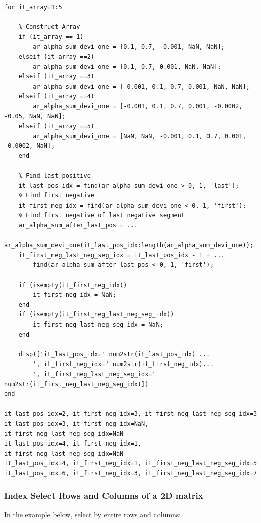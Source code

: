 \documentclass[
]{book}
\begin{document}
\begin{verbatim}
for it_array=1:5
    
    % Construct Array
    if (it_array == 1) 
        ar_alpha_sum_devi_one = [0.1, 0.7, -0.001, NaN, NaN];
    elseif (it_array ==2)
        ar_alpha_sum_devi_one = [0.1, 0.7, 0.001, NaN, NaN];
    elseif (it_array ==3)
        ar_alpha_sum_devi_one = [-0.001, 0.1, 0.7, 0.001, NaN, NaN];
    elseif (it_array ==4)
        ar_alpha_sum_devi_one = [-0.001, 0.1, 0.7, 0.001, -0.0002, -0.05, NaN, NaN];
    elseif (it_array ==5)
        ar_alpha_sum_devi_one = [NaN, NaN, -0.001, 0.1, 0.7, 0.001, -0.0002, NaN];
    end
    
    % Find last positive
    it_last_pos_idx = find(ar_alpha_sum_devi_one > 0, 1, 'last');
    % Find first negative
    it_first_neg_idx = find(ar_alpha_sum_devi_one < 0, 1, 'first');
    % Find first negative of last negative segment
    ar_alpha_sum_after_last_pos = ...
        ar_alpha_sum_devi_one(it_last_pos_idx:length(ar_alpha_sum_devi_one));
    it_first_neg_last_neg_seg_idx = it_last_pos_idx - 1 + ...
        find(ar_alpha_sum_after_last_pos < 0, 1, 'first');
    
    if (isempty(it_first_neg_idx))
        it_first_neg_idx = NaN;
    end
    if (isempty(it_first_neg_last_neg_seg_idx))
        it_first_neg_last_neg_seg_idx = NaN;
    end
    
    disp(['it_last_pos_idx=' num2str(it_last_pos_idx) ...
        ', it_first_neg_idx=' num2str(it_first_neg_idx)... 
        ', it_first_neg_last_neg_seg_idx=' num2str(it_first_neg_last_neg_seg_idx)])
end

it_last_pos_idx=2, it_first_neg_idx=3, it_first_neg_last_neg_seg_idx=3
it_last_pos_idx=3, it_first_neg_idx=NaN, it_first_neg_last_neg_seg_idx=NaN
it_last_pos_idx=4, it_first_neg_idx=1, it_first_neg_last_neg_seg_idx=NaN
it_last_pos_idx=4, it_first_neg_idx=1, it_first_neg_last_neg_seg_idx=5
it_last_pos_idx=6, it_first_neg_idx=3, it_first_neg_last_neg_seg_idx=7
\end{verbatim}

\hypertarget{index-select-rows-and-columns-of-a-2d-matrix}{%
\subsubsection{Index Select Rows and Columns of a 2D matrix}\label{index-select-rows-and-columns-of-a-2d-matrix}}

In the example below, select by entire rows and columns:
\end{document}

